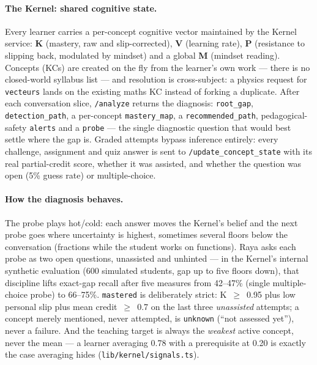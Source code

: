 \documentclass[11pt,a4paper]{article}
\begin{document}
\paragraph{The Kernel: shared cognitive state.} Every learner carries a
per-concept cognitive vector maintained by the Kernel service: \textbf{K}
(mastery, raw and slip-corrected), \textbf{V} (learning rate), \textbf{P}
(resistance to slipping back, modulated by mindset) and a global \textbf{M}
(mindset reading). Concepts (KCs) are created on the fly from the learner's
own work --- there is no closed-world syllabus list --- and resolution is
cross-subject: a physics request for \texttt{vecteurs} lands on the existing
maths KC instead of forking a duplicate. After each conversation slice,
\texttt{/analyze} returns the diagnosis: \texttt{root\_gap},
\texttt{detection\_path}, a per-concept \texttt{mastery\_map}, a
\texttt{recommended\_path}, pedagogical-safety \texttt{alerts} and a
\texttt{probe} --- the single diagnostic question that would best settle where
the gap is. Graded attempts bypass inference entirely: every challenge,
assignment and quiz answer is sent to \texttt{/update\_concept\_state} with
its real partial-credit score, whether it was assisted, and whether the
question was open (5\% guess rate) or multiple-choice.

\paragraph{How the diagnosis behaves.} The probe plays hot/cold: each answer
moves the Kernel's belief and the next probe goes where uncertainty is
highest, sometimes several floors below the conversation (fractions while the
student works on functions). Raya asks each probe as two open questions,
unassisted and unhinted --- in the Kernel's internal synthetic evaluation
(600 simulated students, gap up to five floors down), that discipline lifts
exact-gap recall after five measures from 42--47\% (single multiple-choice
probe) to 66--75\%. \texttt{mastered} is deliberately strict: K~$\geq$~0.95
plus low personal slip plus mean credit~$\geq$~0.7 on the last three
\emph{unassisted} attempts; a concept merely mentioned, never attempted, is
\texttt{unknown} (``not assessed yet''), never a failure. And the teaching
target is always the \emph{weakest} active concept, never the mean --- a
learner averaging 0.78 with a prerequisite at 0.20 is exactly the case
averaging hides (\texttt{lib/kernel/signals.ts}).
\end{document}
